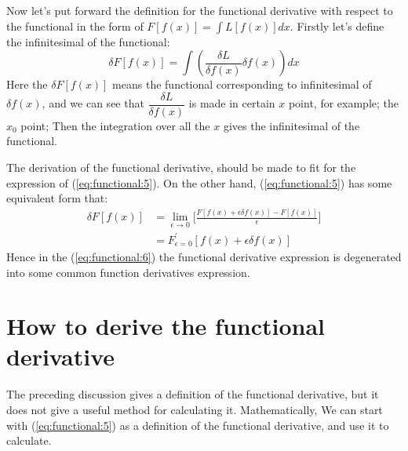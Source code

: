 Now let's put forward the definition for the functional derivative
with respect to the functional in the form of $F[f(x)] = \int L[f(x)]
dx$. Firstly let's define the infinitesimal of the functional:
\begin{equation}
  \label{eq:functional:5}
 \delta F[ f(x)] = \int \left(\frac{\delta L}{\delta
      f(x)}\delta f(x)\right)dx
\end{equation}
Here the $\delta F[ f(x)]$ means the functional corresponding to
infinitesimal of $\delta f(x)$, and we can see that $\dfrac{\delta
L}{\delta f(x)}$ is made in certain $x$ point, for example; the
$x_{0}$ point; Then the integration over all the $x$ gives the
infinitesimal of the functional. 

The derivation of the functional derivative, should be made to fit for
the expression of (\ref{eq:functional:5}). On the other hand,
(\ref{eq:functional:5}) has some equivalent form that:
\begin{align}
  \label{eq:functional:6}
 \delta F[ f(x)] &= \lim_{\epsilon \rightarrow 0}\Bigg[ \frac{F[f(x)
    +\epsilon \delta f(x) ] - F[f(x)]}{\epsilon}\Bigg] \nonumber \\
  &= F^{'}_{\epsilon=0}[f(x) + \epsilon \delta f(x) ]
\end{align}
Hence in the (\ref{eq:functional:6}) the functional derivative
expression is degenerated into some common function derivatives
expression.


\section{How to derive the functional derivative}
%
%
%
%
%
The preceding discussion gives a definition of the functional
derivative, but it does not give a useful method for calculating it.
Mathematically, We can start with (\ref{eq:functional:5}) as a
definition of the functional derivative, and use it to calculate.

